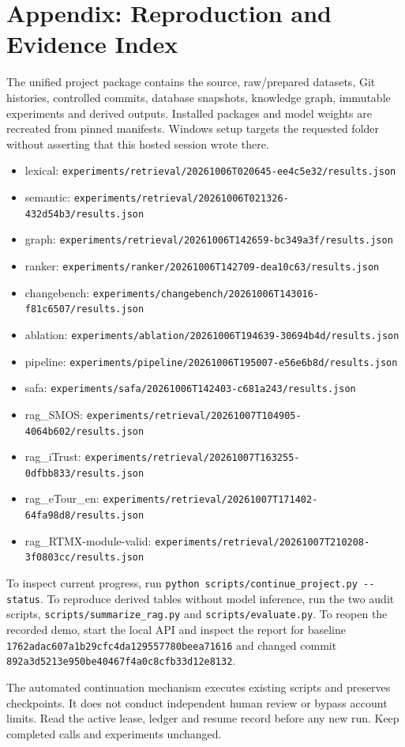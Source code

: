 \documentclass[
  11pt,
  a4paper,
]{report}
\begin{document}
\hypertarget{appendix-reproduction-and-evidence-index}{%
\chapter{Appendix: Reproduction and Evidence
Index}\label{appendix-reproduction-and-evidence-index}}

The unified project package contains the source, raw/prepared datasets,
Git histories, controlled commits, database snapshots, knowledge graph,
immutable experiments and derived outputs. Installed packages and model
weights are recreated from pinned manifests. Windows setup targets the
requested folder without asserting that this hosted session wrote there.

\begin{itemize}
\item
  lexical:
  \texttt{experiments/retrieval/20261006T020645-ee4c5e32/results.json}
\item
  semantic:
  \texttt{experiments/retrieval/20261006T021326-432d54b3/results.json}
\item
  graph:
  \texttt{experiments/retrieval/20261006T142659-bc349a3f/results.json}
\item
  ranker:
  \texttt{experiments/ranker/20261006T142709-dea10c63/results.json}
\item
  changebench:
  \texttt{experiments/changebench/20261006T143016-f81c6507/results.json}
\item
  ablation:
  \texttt{experiments/ablation/20261006T194639-30694b4d/results.json}
\item
  pipeline:
  \texttt{experiments/pipeline/20261006T195007-e56e6b8d/results.json}
\item
  safa: \texttt{experiments/safa/20261006T142403-c681a243/results.json}
\item
  rag\_SMOS:
  \texttt{experiments/retrieval/20261007T104905-4064b602/results.json}
\item
  rag\_iTrust:
  \texttt{experiments/retrieval/20261007T163255-0dfbb833/results.json}
\item
  rag\_eTour\_en:
  \texttt{experiments/retrieval/20261007T171402-64fa98d8/results.json}
\item
  rag\_RTMX-module-valid:
  \texttt{experiments/retrieval/20261007T210208-3f0803cc/results.json}
\end{itemize}

To inspect current progress, run
\texttt{python\ scripts/continue\_project.py\ -\/-status}. To reproduce
derived tables without model inference, run the two audit scripts,
\texttt{scripts/summarize\_rag.py} and \texttt{scripts/evaluate.py}. To
reopen the recorded demo, start the local API and inspect the report for
baseline \texttt{1762adac607a1b29cfc4da129557780beea71616} and changed
commit \texttt{892a3d5213e950be40467f4a0c8cfb33d12e8132}.

The automated continuation mechanism executes existing scripts and
preserves checkpoints. It does not conduct independent human review or
bypass account limits. Read the active lease, ledger and resume record
before any new run. Keep completed calls and experiments unchanged.
\end{document}
